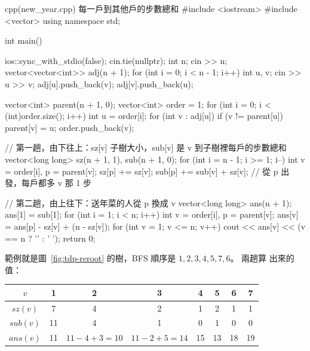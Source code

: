 \begin{example}[label=ex:tdp-distsum]{cpp}{(new\_year.cpp) 每一戶到其他戶的步數總和}
#include <iostream>
#include <vector>
using namespace std;

int main() {
    ios::sync_with_stdio(false);
    cin.tie(nullptr);
    int n;
    cin >> n;
    vector<vector<int>> adj(n + 1);
    for (int i = 0; i < n - 1; i++) {
        int u, v;
        cin >> u >> v;
        adj[u].push_back(v);
        adj[v].push_back(u);
    }

    vector<int> parent(n + 1, 0);
    vector<int> order = {1};
    for (int i = 0; i < (int)order.size(); i++) {
        int u = order[i];
        for (int v : adj[u]) {
            if (v != parent[u]) {
                parent[v] = u;
                order.push_back(v);
            }
        }
    }

    // 第一趟，由下往上：sz[v] 子樹大小，sub[v] 是 v 到子樹裡每戶的步數總和
    vector<long long> sz(n + 1, 1), sub(n + 1, 0);
    for (int i = n - 1; i >= 1; i--) {
        int v = order[i], p = parent[v];
        sz[p] += sz[v];
        sub[p] += sub[v] + sz[v];           // 從 p 出發，每戶都多 v 那 1 步
    }

    // 第二趟，由上往下：送年菜的人從 p 換成 v
    vector<long long> ans(n + 1);
    ans[1] = sub[1];
    for (int i = 1; i < n; i++) {
        int v = order[i], p = parent[v];
        ans[v] = ans[p] - sz[v] + (n - sz[v]);
    }
    for (int v = 1; v <= n; v++) {
        cout << ans[v] << (v == n ? '\n' : ' ');
    }
    return 0;
}
\end{example}


範例就是圖~\ref{fig:tdp-reroot} 的樹，BFS 順序是 $1, 2, 3, 4, 5, 7, 6$。 兩趟算
出來的值：

\begin{center}
\begin{tabular}{c|ccccccc}
\toprule
$v$ & 1 & 2 & 3 & 4 & 5 & 6 & 7 \\
\midrule
$\mathit{sz}(v)$ & 7 & 4 & 2 & 1 & 2 & 1 & 1 \\
$\mathit{sub}(v)$ & 11 & 4 & 1 & 0 & 1 & 0 & 0 \\
$\mathit{ans}(v)$ & 11 & $11 - 4 + 3 = 10$ & $11 - 2 + 5 = 14$ & 15 & 13 & 18 & 19 \\
\bottomrule
\end{tabular}
\end{center}

